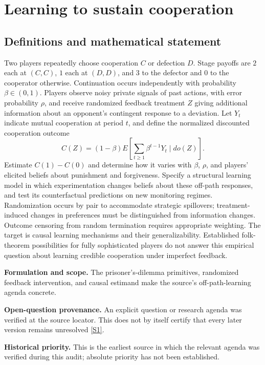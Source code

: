 \documentclass[11pt]{article}
\newcommand{\sref}[2]{\hyperlink{source:#1:#2}{[S#2]}}
\begin{document}
\section*{Learning to sustain cooperation}\label{30007564}
\subsection{Definitions and mathematical statement}
Two players repeatedly choose cooperation \(C\) or defection \(D\). Stage payoffs are \(2\) each at \((C,C)\), \(1\) each at \((D,D)\), and \(3\) to the defector and \(0\) to the cooperator otherwise. Continuation occurs independently with probability \(\beta\in(0,1)\). Players observe noisy private signals of past actions, with error probability \(\rho\), and receive randomized feedback treatment \(Z\) giving additional information about an opponent's contingent response to a deviation. Let \(Y_t\) indicate mutual cooperation at period \(t\), and define the normalized discounted cooperation outcome
\[
 C(Z)=(1-\beta)E\left[\sum_{t\geq1}\beta^{t-1}Y_t\mid do(Z)\right].
\]
Estimate \(C(1)-C(0)\) and determine how it varies with \(\beta\), \(\rho\), and players' elicited beliefs about punishment and forgiveness. Specify a structural learning model in which experimentation changes beliefs about these off-path responses, and test its counterfactual predictions on new monitoring regimes. Randomization occurs by pair to accommodate strategic spillovers; treatment-induced changes in preferences must be distinguished from information changes. Outcome censoring from random termination requires appropriate weighting. The target is causal learning mechanisms and their generalizability. Established folk-theorem possibilities for fully sophisticated players do not answer this empirical question about learning credible cooperation under imperfect feedback.

\par\textbf{Formulation and scope.} The prisoner’s-dilemma primitives, randomized feedback intervention, and causal estimand make the source’s off-path-learning agenda concrete.

\par\textbf{Open-question provenance.} An explicit question or research agenda was verified at the source locator. This does not by itself certify that every later version remains unresolved \sref{30007564}{1}.

\par\textbf{Historical priority.} This is the earliest source in which the relevant agenda was verified during this audit; absolute priority has not been established.
\end{document}
